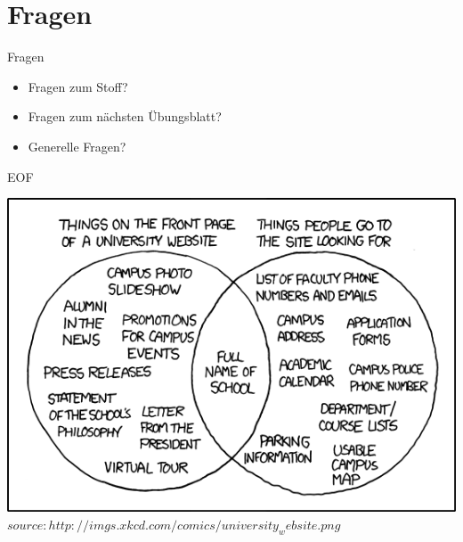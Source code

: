 \documentclass[18pt]{beamer}
\begin{document}
	\section{Fragen}
	\begin{frame} {Fragen}
		\begin{itemize}
			\item Fragen zum Stoff?
			\item Fragen zum n\"achsten \"Ubungsblatt?
			\item Generelle Fragen?
		\end{itemize}
	\end{frame}

	
	\begin{frame} {EOF}
		\begin{center}
			\includegraphics[scale=0.5]{graphics/02/eof2.png}\\
			\tiny $source: http://imgs.xkcd.com/comics/university_website.png$
		\end{center}
	\end{frame}
\end{document}
